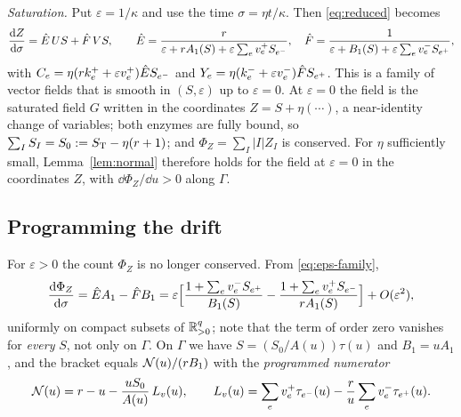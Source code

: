 \emph{Saturation.} Put \(\varepsilon=1/\kappa\) and use the time \(\sigma=\eta t/\kappa\).
Then \eqref{eq:reduced} becomes
\begin{equation}\label{eq:eps-family}
 \frac{\mathrm d Z}{\mathrm d\sigma}=\hat E\,US+\hat F\,VS,\qquad
 \hat E=\frac{r}{\varepsilon+rA_1(S)+\varepsilon\sum_ev_e^+S_{e^{-}}},\quad
 \hat F=\frac{1}{\varepsilon+B_1(S)+\varepsilon\sum_ev_e^-S_{e^{+}}},
\end{equation}
with \(C_e=\eta(rk_e^++\varepsilon v_e^+)\hat ES_{e^{-}}\) and
\(Y_e=\eta(k_e^-+\varepsilon v_e^-)\hat FS_{e^{+}}\). This is a family of vector fields that is
smooth in \((S,\varepsilon)\) up to \(\varepsilon=0\). At \(\varepsilon=0\) the field is the
saturated field \(G\) written in the coordinates \(Z=S+\eta(\cdots)\), a near-identity change
of variables; both enzymes are fully bound, so \(\sum_IS_I=S_0:=S_{\mathrm T}-\eta(r+1)\); and
\(\Phi_Z=\sum_I|I|Z_I\) is conserved. For \(\eta\) sufficiently small,
Lemma~\ref{lem:normal} therefore holds for the field at \(\varepsilon=0\) in the coordinates
\(Z\), with \(\dd\Phi_Z/\dd u>0\) along \(\Gamma\).

\subsection{Programming the drift}
For \(\varepsilon>0\) the count \(\Phi_Z\) is no longer conserved. From
\eqref{eq:eps-family},
\begin{equation}\label{eq:drift-exact}
 \frac{\mathrm d\Phi_Z}{\mathrm d\sigma}=\hat EA_1-\hat FB_1
 =\varepsilon\Bigl[\frac{1+\sum_ev_e^-S_{e^{+}}}{B_1(S)}
          -\frac{1+\sum_ev_e^+S_{e^{-}}}{rA_1(S)}\Bigr]+O(\varepsilon^2),
\end{equation}
uniformly on compact subsets of \(\mathbb R^q_{>0}\); note that the term of order zero vanishes for
\emph{every} \(S\), not only on \(\Gamma\). On \(\Gamma\) we have \(S=(S_0/A(u))\tau(u)\) and
\(B_1=uA_1\), and the bracket equals \(\mathcal N(u)/(rB_1)\) with the \emph{programmed numerator}
\begin{equation}\label{eq:numerator}
 \mathcal N(u)=r-u-\frac{uS_0}{A(u)}\,L_v(u),\qquad
 L_v(u)=\sum_ev_e^+\tau_{e^{-}}(u)-\frac ru\sum_ev_e^-\tau_{e^{+}}(u).
\end{equation}

